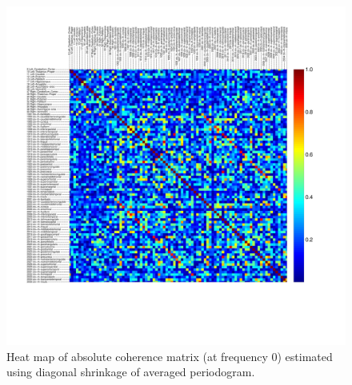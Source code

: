 \begin{figure}[p]
    \centering
    \includegraphics[width=1.1\textwidth]{img/sh_hm_0.pdf}
    \caption{Heat map of absolute coherence matrix (at frequency $0$) estimated using diagonal shrinkage of averaged periodogram.}
    \label{fig:realdatafullshrinkage}
\end{figure}



